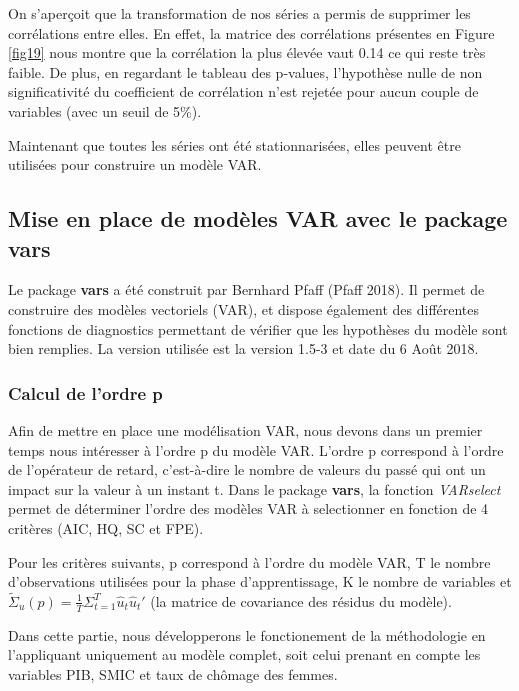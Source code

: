 \documentclass[11pt,]{article}
\begin{document}
On s'aperçoit que la transformation de nos séries a permis de supprimer
les corrélations entre elles. En effet, la matrice des corrélations
présentes en Figure \ref{fig19} nous montre que la corrélation la plus
élevée vaut 0.14 ce qui reste très faible. De plus, en regardant le
tableau des p-values, l'hypothèse nulle de non significativité du
coefficient de corrélation n'est rejetée pour aucun couple de variables
(avec un seuil de 5\%).

Maintenant que toutes les séries ont été stationnarisées, elles peuvent
être utilisées pour construire un modèle VAR.

\subsection{Mise en place de modèles VAR avec le package
vars}\label{mise-en-place-de-modeles-var-avec-le-package-vars}

Le package \textbf{vars} a été construit par Bernhard Pfaff (Pfaff
2018). Il permet de construire des modèles vectoriels (VAR), et dispose
également des différentes fonctions de diagnostics permettant de
vérifier que les hypothèses du modèle sont bien remplies. La version
utilisée est la version 1.5-3 et date du 6 Août 2018.

\subsubsection{Calcul de l'ordre p}\label{calcul-de-lordre-p}

Afin de mettre en place une modélisation VAR, nous devons dans un
premier temps nous intéresser à l'ordre p du modèle VAR. L'ordre p
correspond à l'ordre de l'opérateur de retard, c'est-à-dire le nombre de
valeurs du passé qui ont un impact sur la valeur à un instant t. Dans le
package \textbf{vars}, la fonction \emph{VARselect} permet de déterminer
l'ordre des modèles VAR à selectionner en fonction de 4 critères (AIC,
HQ, SC et FPE).

Pour les critères suivants, p correspond à l'ordre du modèle VAR, T le
nombre d'observations utilisées pour la phase d'apprentissage, K le
nombre de variables et
\(\tilde{\Sigma}_u (p) = \frac{1}{T} \Sigma_{t=1}^T \hat{u}_t \hat{u}_t'\)
(la matrice de covariance des résidus du modèle).

Dans cette partie, nous développerons le fonctionement de la
méthodologie en l'appliquant uniquement au modèle complet, soit celui
prenant en compte les variables PIB, SMIC et taux de chômage des femmes.
\end{document}
